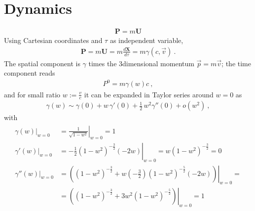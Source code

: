 \documentclass[letterpaper,10pt,english]{jupyterBook}
\begin{document}
\section{Dynamics}
\label{\detokenize{ch/relativity-special/notes:dynamics}}
\sphinxAtStartPar
{}
\begin{equation*}
\begin{split}\mathbf{P} = m \mathbf{U}\end{split}
\end{equation*}
\sphinxAtStartPar
Using Cartesian coordinates and \(\tau\) as independent variable,
\begin{equation*}
\begin{split}\mathbf{P} = m \mathbf{U} = m \frac{d \mathbf{X}}{d \tau} = m \gamma (c, \vec{v}) \ .\end{split}
\end{equation*}
\sphinxAtStartPar
The spatial component is \(\gamma\) times the 3\sphinxhyphen{}dimensional momentum \(\vec{p} = m \vec{v}\); the time component reads
\begin{equation*}
\begin{split}P^0 = m \gamma(w) c \ ,\end{split}
\end{equation*}
\sphinxAtStartPar
and for small ratio \(w:= \frac{v}{c}\) it can be expanded in Taylor series around \(w = 0\) as
\begin{equation*}
\begin{split}\gamma(w) \sim \gamma(0) + w \, \gamma'(0) + \frac{1}{2} \, w^2 \gamma''(0) + o(w^2) \ ,\end{split}
\end{equation*}
\sphinxAtStartPar
with
\begin{equation*}
\begin{split}\begin{aligned}
\left.\gamma(w)  \right|_{w=0} & = \left.\frac{1}{\sqrt{1 - w^2}}\right|_{w=0} = 1 \\
\left.\gamma'(w) \right|_{w=0} & = \left.-\frac{1}{2}(1 - w^2)^{-\frac{3}{2}} (- 2 w)\right|_{w=0} = w (1 - w^2)^{-\frac{3}{2}}= 0 \\
\left.\gamma''(w)\right|_{w=0} & = \left. \left( (1-w^2)^{-\frac{3}{2}} + w \left(-\frac{3}{2} \right)(1-w^2)^{-\frac{5}{2}} (- 2 w)  \right)\right|_{w=0} = \\ 
  & = \left. \left( (1-w^2)^{-\frac{3}{2}} + 3 w^2 (1-w^2)^{-\frac{5}{2}} \right)\right|_{w=0} = 1 \\
\end{aligned}\end{split}
\end{equation*}
\end{document}
